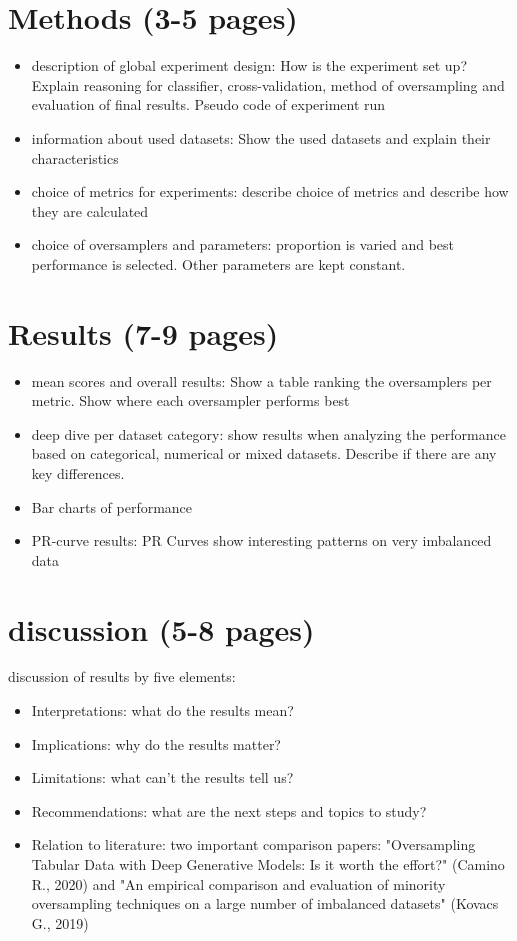 \documentclass{article}
\begin{document}
\section{Methods (3-5 pages)}
    \begin{itemize}
        \item description of global experiment design: How is the experiment set up? Explain reasoning for classifier, cross-validation, method of oversampling and evaluation of final results. Pseudo code of experiment run
        \item information about used datasets: Show the used datasets and explain their characteristics
        \item choice of metrics for experiments: describe choice of metrics and describe how they are calculated
        \item choice of oversamplers and parameters: proportion is varied and best performance is selected. Other parameters are kept constant.
    \end{itemize}
    
\section{Results (7-9 pages)}
        \begin{itemize}
        \item mean scores and overall results: Show a table ranking the oversamplers per metric. Show where each oversampler performs best 
        \item deep dive per dataset category: show results when analyzing the performance based on categorical, numerical or mixed datasets. Describe if there are any key differences.
        \item Bar charts of performance 
        \item PR-curve results: PR Curves show interesting patterns on very imbalanced data 
    \end{itemize}
    
    
\section{discussion (5-8 pages)}
discussion of results by five elements:
    \begin{itemize}
        \item Interpretations: what do the results mean?
        \item Implications: why do the results matter?
        \item Limitations: what can’t the results tell us?
        \item Recommendations: what are the next steps and topics to study?
        \item Relation to literature: two important comparison papers: "Oversampling Tabular Data with Deep Generative Models: Is it worth the effort?" (Camino R., 2020) and "An empirical comparison and evaluation of minority oversampling techniques on a large number of imbalanced datasets" (Kovacs G., 2019)
    \end{itemize}
\end{document}
